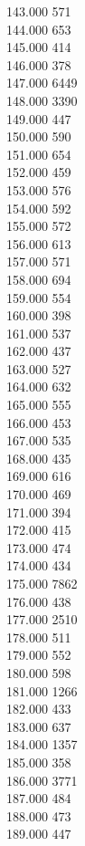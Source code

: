 { 143.000	571 \\
 144.000	653 \\
 145.000	414 \\
 146.000	378 \\
 147.000	6449 \\
 148.000	3390 \\
 149.000	447 \\
 150.000	590 \\
 151.000	654 \\
 152.000	459 \\
 153.000	576 \\
 154.000	592 \\
 155.000	572 \\
 156.000	613 \\
 157.000	571 \\
 158.000	694 \\
 159.000	554 \\
 160.000	398 \\
 161.000	537 \\
 162.000	437 \\
 163.000	527 \\
 164.000	632 \\
 165.000	555 \\
 166.000	453 \\
 167.000	535 \\
 168.000	435 \\
 169.000	616 \\
 170.000	469 \\
 171.000	394 \\
 172.000	415 \\
 173.000	474 \\
 174.000	434 \\
 175.000	7862 \\
 176.000	438 \\
 177.000	2510 \\
 178.000	511 \\
 179.000	552 \\
 180.000	598 \\
 181.000	1266 \\
 182.000	433 \\
 183.000	637 \\
 184.000	1357 \\
 185.000	358 \\
 186.000	3771 \\
 187.000	484 \\
 188.000	473 \\
 189.000	447 \\
}
